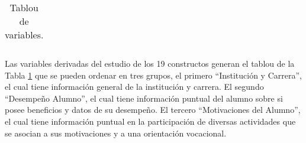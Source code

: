 \begin{longtable}{| p{4cm}| p{8cm} |}
	\caption{Tablou de variables.}
	\label{tabla:Tablou de variables}
\end{longtable}	

Las variables derivadas del estudio de los 19 constructos generan el tablou de la Tabla \ref{tabla:Tablou de variables} que se pueden ordenar en tres grupos, el primero ``Institución y Carrera'', el cual tiene información general de la institución y carrera. El segundo ``Desempeño Alumno'', el cual tiene información puntual del alumno sobre si posee beneficios y datos de su desempeño. El tercero ``Motivaciones del Alumno'', el cual tiene información puntual en la participación de diversas actividades que se asocian a sus motivaciones y a una orientación vocacional.\\

